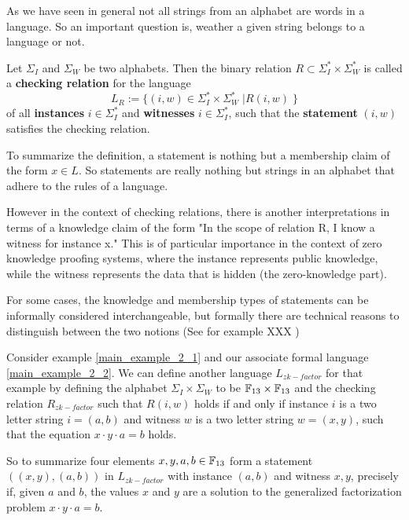\begin{example}
\end{example}

\begin{example}[Compiler]
\end{example}



As we have seen in general not all strings from an alphabet are words in a language. So an important question is, weather a given string belongs to a language or not. 

\begin{definition} Let $\Sigma_I$ and $\Sigma_W$ be two alphabets. Then the binary relation $R\subset \Sigma_I^* \times \Sigma_W^*$ is called a \textbf{checking relation} for the language 
$$
L_R := \{(i,w) \in \Sigma_I^* \times \Sigma_W^*\;| R(i,w)\; \}
$$ 
of all \textbf{instances} $i\in \Sigma_I^*$ and \textbf{witnesses} $i\in \Sigma_I^*$, such that the \textbf{statement} $(i,w)$ satisfies the checking relation.
\end{definition}
\begin{remark}
To summarize the definition, a statement is nothing but a membership claim of the form $x\in L$. So statements are really nothing but strings in an alphabet that adhere to the rules of a language. 

However in the context of checking relations, there is another interpretations in terms of a knowledge claim of the form "In the scope of relation R, I know a witness for instance x." This is of particular importance in the context of zero knowledge proofing systems, where the instance represents public knowledge, while the witness represents the data that is hidden (the zero-knowledge part). 

For some cases, the knowledge and membership types of statements can be informally considered interchangeable, but formally there are technical reasons to distinguish between the two notions (See for example XXX
) 
\end{remark}
\begin{example}
\label{main_example_2_3}
Consider example \ref{main_example_2_1} and our associate formal language \ref{main_example_2_2}. We can define another language $L_{zk-factor}$ for that example by defining the alphabet $\Sigma_I \times \Sigma_W$ to be $\mathbb{F}_{13} \times \mathbb{F}_{13}$ and the checking relation $R_{zk-factor}$ such that
$R(i,w)$ holds if and only if instance $i$ is a two letter string $i=(a,b)$ and witness $w$ is a two letter string $w=(x,y)$, such that the equation $x\cdot y \cdot a = b$ holds. 

So to summarize four elements $x,y,a,b\in \mathbb{F}_{13}$ form a statement 
$((x,y),(a,b))$ in $L_{zk-factor}$ with instance $(a,b)$ and witness $x,y$, precisely if, given $a$ and $b$, the values $x$ and $y$ are a solution to the generalized factorization problem $x\cdot y \cdot a = b$.
\end{example}




